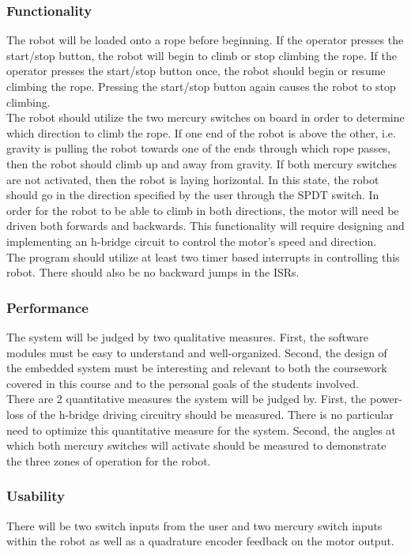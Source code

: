 \documentclass{article}
\begin{document}
		\subsubsection{Functionality}
			The robot will be loaded onto a rope before beginning. If the operator presses the start/stop button, the robot will begin to climb or stop climbing the rope. If the operator presses the start/stop button once, the robot should begin or resume climbing the rope. Pressing the start/stop button again causes the robot to stop climbing.\\
			The robot should utilize the two mercury switches on board in order to determine which direction to climb the rope. If one end of the robot is above the other, i.e. gravity is pulling the robot towards one of the ends through which rope passes, then the robot should climb up and away from gravity. If both mercury switches are not activated, then the robot is laying horizontal. In this state, the robot should go in the direction specified by the user through the SPDT switch. In order for the robot to be able to climb in both directions, the motor will need be driven both forwards and backwards. This functionality will require designing and implementing an h-bridge circuit to control the motor's speed and direction.\\
			The program should utilize at least two timer based interrupts in controlling this robot. There should also be no backward jumps in the ISRs.
		\subsubsection{Performance}
			The system will be judged by two qualitative measures. First, the software modules must be easy to understand and well-organized. Second, the design of the embedded system must be interesting and relevant to both the coursework covered in this course and to the personal goals of the students involved.\\
			There are 2 quantitative measures the system will be judged by. First, the power-loss of the h-bridge driving circuitry should be measured. There is no particular need to optimize this quantitative measure for the system. Second, the angles at which both mercury switches will activate should be measured to demonstrate the three zones of operation for the robot.
		\subsubsection{Usability}
			There will be two switch inputs from the user and two mercury switch inputs within the robot as well as a quadrature encoder feedback on the motor output.
\end{document}
